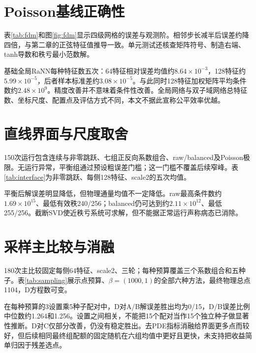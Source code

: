 \section{Poisson基线正确性}
表\ref{tab:fdm}和图\ref{fig:fdm}显示四级网格的误差与观测阶。相邻步长减半后误差约降四倍，与第二章的正弦特征值推导一致。单元测试还核查矩阵符号、制造右端、tanh导数和秩亏最小范数解。
\begin{table}[htbp]\centering\caption{Poisson五点差分真实结果}\label{tab:fdm}\end{table}
基础全局RaNN每种特征数五次：64特征相对误差均值约$8.64\times10^{-3}$，128特征约$5.99\times10^{-5}$，后者样本标准差约$3.08\times10^{-5}$。与此同时128特征加权矩阵平均条件数约$2.48\times10^9$。精度改善并不意味着条件性改善。全局网络与双子域网络总特征数、坐标尺度、配置点及评估方式不同，本文不据此宣称公平效率优越。

\section{直线界面与尺度取舍}
150次运行包含连续与非零跳跃、七组正反向系数组合、raw/balanced及Poisson极限。无运行异常，平衡组通过预设粗误差门槛；这一门槛不覆盖后续窄峰。表\ref{tab:interface}为非零跳跃、每侧128特征、scale2的五次均值。
\begin{table}[htbp]\centering\caption{高对比度下解与物理通量，五种子均值及样本标准差}\label{tab:interface}\resizebox{\textwidth}{!}{}\end{table}
平衡后解误差明显降低，但物理通量均值不一定降低。raw最高条件数约$1.69\times10^{15}$、最低有效秩240/256；balanced仍可达到约$2.11\times10^{12}$、最低255/256。截断SVD使近秩亏系统可求解，但不能据正常运行声称病态已消除。

\section{采样主比较与消融}
180次主比较固定每侧64特征、scale2、三轮；每种预算覆盖三个系数组合和五种子。表\ref{tab:sampling}展示点预算、$\beta=(1000,1)$的全部六种方法，最终物理总点1104，D方程数可变。
\begin{table}[htbp]\centering\caption{等物理点预算下采样与消融，误差为均值及样本标准差}\label{tab:sampling}\resizebox{\textwidth}{!}{}\end{table}
在每种预算的3设置乘5种子配对中，D对A/B解误差胜出均为0/15，D/B误差比例中位数约1.264和1.256。设置之间相关，不能把15个配对当作15个独立种子做显著性推断。D对C仅部分改善，仍没有稳定胜出。去PDE指标消融给界面更多点而较好，但后续相同最终组配额的固定随机在六组均值中更好且更快，未支持把收益简单归因于残差选点。

